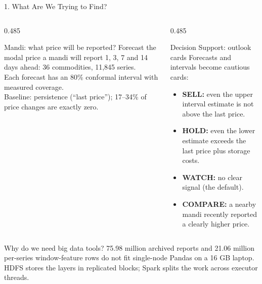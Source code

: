 \documentclass[aspectratio=169,10pt]{beamer}
\begin{document}
\begin{frame}{1. What Are We Trying to Find?}
  \begin{columns}[T,onlytextwidth]
    \begin{column}{0.485\textwidth}
      \begin{block}{Mandi: what price will be reported?}
        \small
        Forecast the modal price a mandi will report 1, 3, 7 and 14 days ahead: 36 commodities, 11,845 series.\\[0.3em]
        Each forecast has an 80\% conformal interval with measured coverage.\\[0.3em]
        Baseline: persistence (``last price''); 17--34\% of price changes are exactly zero.
      \end{block}
    \end{column}

    \begin{column}{0.485\textwidth}
      \begin{block}{Decision Support: outlook cards}
        \small
        Forecasts and intervals become cautious cards:
        \begin{itemize}\footnotesize
          \item \textbf{SELL:} even the upper interval estimate is not above the last price.
          \item \textbf{HOLD:} even the lower estimate exceeds the last price plus storage costs.
          \item \textbf{WATCH:} no clear signal (the default).
          \item \textbf{COMPARE:} a nearby mandi recently reported a clearly higher price.
        \end{itemize}
      \end{block}
    \end{column}
  \end{columns}

  \vspace{0.1cm}
  \begin{block}{Why do we need big data tools?}
    \small
    75.98 million archived reports and 21.06 million per-series window-feature rows do not fit single-node Pandas on a 16 GB laptop. HDFS stores the layers in replicated blocks; Spark splits the work across executor threads.
  \end{block}

  \vspace{0.05cm}
\end{frame}
\end{document}
